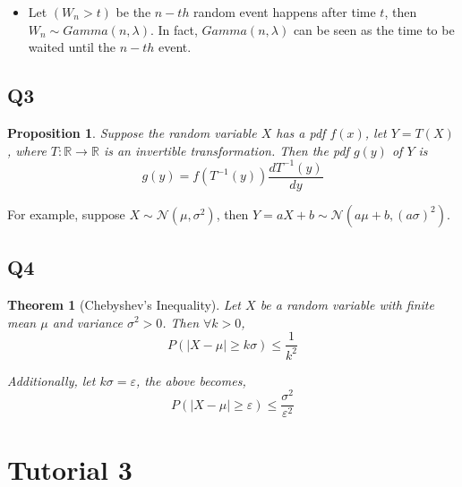\documentclass[
]{book}
\providecommand{\tightlist}{%
  \setlength{\itemsep}{0pt}\setlength{\parskip}{0pt}}
\newtheorem{theorem}{Theorem}[chapter]
\newtheorem{proposition}{Proposition}[chapter]
\theoremstyle{definition}
\theoremstyle{definition}
\theoremstyle{definition}
\theoremstyle{remark}
\begin{document}
\begin{itemize}
\tightlist
\item
  Let \((W_n>t)\) be the \(n-th\) random event happens after time \(t\), then \(W_n\sim Gamma(n, \lambda)\). In fact, \(Gamma(n,\lambda)\) can be seen as the time to be waited until the \(n-th\) event.
\end{itemize}

\hypertarget{q3}{%
\section{Q3}\label{q3}}

\begin{proposition}
\protect\hypertarget{prp:unnamed-chunk-2}{}{\label{prp:unnamed-chunk-2} }Suppose the random variable \(X\) has a pdf \(f(x)\), let \(Y = T(X)\), where \(T:\mathbb{R}\rightarrow \mathbb{R}\) is an invertible transformation. Then the pdf \(g(y)\) of \(Y\) is
\begin{equation*}
g(y) = f(T^{-1}(y))\frac{d T^{-1}(y)}{dy}
\end{equation*}
\end{proposition}

For example, suppose \(X\sim\mathcal{N}(\mu,\sigma^2)\), then \(Y=aX+b\sim\mathcal{N}(a\mu+b, (a\sigma)^2)\).

\hypertarget{q4}{%
\section{Q4}\label{q4}}

\begin{theorem}[Chebyshev's Inequality]
\protect\hypertarget{thm:unnamed-chunk-3}{}{\label{thm:unnamed-chunk-3} \iffalse (Chebyshev's Inequality) \fi{} }Let \(X\) be a random variable with finite mean \(\mu\) and variance \(\sigma^2>0\). Then \(\forall k>0\),
\begin{equation*}
P(|X-\mu|\geq k\sigma) \leq \frac{1}{k^2}
\end{equation*}

Additionally, let \(k\sigma = \varepsilon\), the above becomes,
\begin{equation*}
P(|X-\mu|\geq \varepsilon) \leq \frac{\sigma^2}{\varepsilon^2}
\end{equation*}
\end{theorem}

\hypertarget{tutorial-3}{%
\chapter{Tutorial 3}\label{tutorial-3}}
\end{document}
